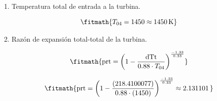 \begin{enumerate}
\[\fitmath{\mathrm{dTt}=\frac{(5306400)}{0.99\cdot (21.34)\cdot 1150}\approx 218.41\,\mathrm{K}}\]

\item Temperatura total de entrada a la turbina.

\[\fitmath{T_{04}=1450\approx 1450\,\mathrm{K}}\]

\item Razón de expansión total-total de la turbina.

\[\fitmath{\mathrm{prt}={\left(1-\frac{\mathrm{dTt}}{0.88\cdot T_{04}}\right)}^{\frac{-1.33}{0.33}}}\]

\[\fitmath{\mathrm{prt}={\left(1-\frac{(218.4100077)}{0.88\cdot (1450)}\right)}^{\frac{-1.33}{0.33}}\approx 2.131101\,}\]

\end{enumerate}
